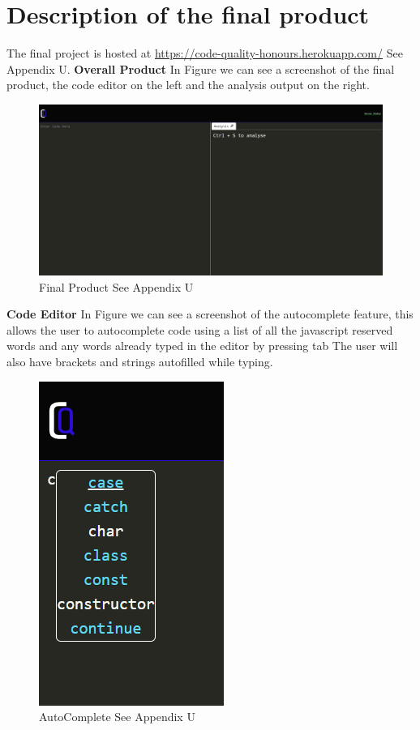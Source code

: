 \newpage
\newpage
\section{Description of the final product}
The final project is hosted at \href{https://code-quality-honours.herokuapp.com/}{https://code-quality-honours.herokuapp.com/} See Appendix U.
\newline
\textbf{Overall Product}
\newline
In Figure  we can see a screenshot of the final product, the code editor on the left and the analysis output on the right.
\begin{figure}[h]
    \includegraphics[width=.5\textwidth]{images/final-screenshot.png}
    \caption{Final Product See Appendix U}
    \label{fig:finalproduct}
\end{figure}
\newline
\newline
\textbf{Code Editor}
\newline
In Figure  we can see a screenshot of the autocomplete feature, this allows the user to autocomplete code using a list of all 
the javascript reserved words and any words already typed in the editor by pressing tab
\newline
The user will also have brackets and strings autofilled while typing.
\begin{figure}[h]
    \includegraphics[width=.3\textwidth]{images/autocomplete.png}
    \caption{AutoComplete See Appendix U}
    \label{fig:autocomplete}
\end{figure}
